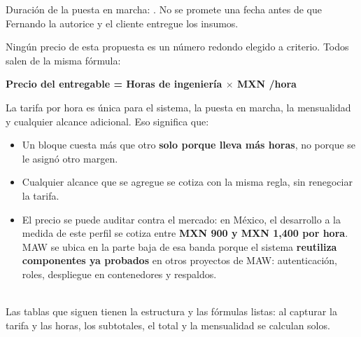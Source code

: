 \documentclass[11pt,letterpaper]{article}
\newcommand{\tarifa}{\PENDIENTE{Fernando}{tarifa}}
\begin{document}
\vspace{8pt}

\noindent Duración de la puesta en marcha: . No se promete una fecha antes de que Fernando la autorice y el cliente entregue los insumos.

\vspace{14pt}


\noindent Ningún precio de esta propuesta es un número redondo elegido a criterio. Todos salen de la misma fórmula:

\vspace{8pt}

\begin{center}
{\large\bfseries\color{azulcom}Precio del entregable \;=\; Horas de ingeniería \;$\times$\; MXN \tarifa/hora}
\end{center}

\vspace{8pt}

\noindent La tarifa por hora es única para el sistema, la puesta en marcha, la mensualidad y cualquier alcance adicional. Eso significa que:

\begin{itemize}[leftmargin=16pt, itemsep=3pt, topsep=4pt]
    \item Un bloque cuesta más que otro \textbf{solo porque lleva más horas}, no porque se le asignó otro margen.
    \item Cualquier alcance que se agregue se cotiza con la misma regla, sin renegociar la tarifa.
    \item El precio se puede auditar contra el mercado: en México, el desarrollo a la medida de este perfil se cotiza entre \textbf{MXN 900 y MXN 1,400 por hora}. MAW se ubica en la parte baja de esa banda porque el sistema \textbf{reutiliza componentes ya probados} en otros proyectos de MAW: autenticación, roles, despliegue en contenedores y respaldos.
\end{itemize}

\vspace{8pt}

\begin{cajaPendiente}
 \quad {}\\[4pt]
Las tablas que siguen tienen la estructura y las fórmulas listas: al capturar la tarifa y las horas, los subtotales, el total y la mensualidad se calculan solos.
\end{cajaPendiente}
\end{document}
